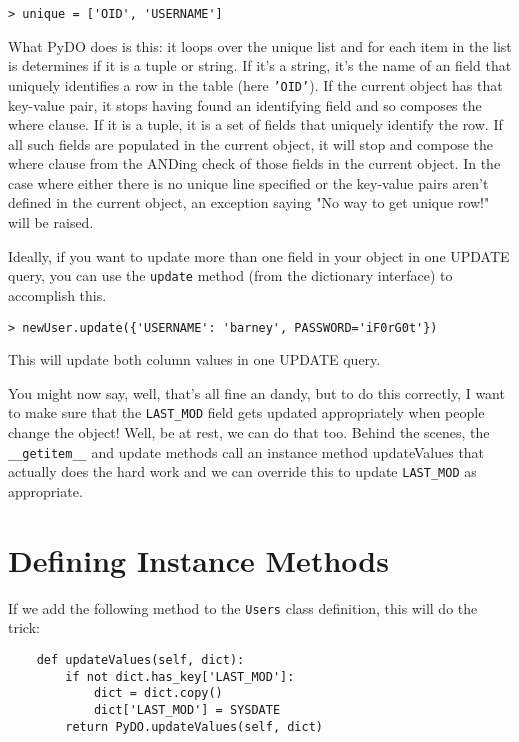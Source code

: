 \documentclass[titlepage]{manual}
\begin{document}
\begin{verbatim}
> unique = ['OID', 'USERNAME']
\end{verbatim}

What PyDO does is this: it loops over the unique list and for each
item in the list is determines if it is a tuple or string.  If it's a
string, it's the name of an field that uniquely identifies a row in
the table (here \texttt{'OID'}).  If the current object has that
key-value pair, it stops having found an identifying field and so
composes the where clause.  If it is a tuple, it is a set of fields
that uniquely identify the row.  If all such fields are populated in
the current object, it will stop and compose the where clause from the
ANDing check of those fields in the current object.  In the case where
either there is no unique line specified or the key-value pairs aren't
defined in the current object, an exception saying "No way to get
unique row!" will be raised.

Ideally, if you want to update more than one field in your object in
one UPDATE query, you can use the \texttt{update} method (from the
dictionary interface) to accomplish this.

\begin{verbatim}
> newUser.update({'USERNAME': 'barney', PASSWORD='iF0rG0t'})
\end{verbatim}

This will update both column values in one UPDATE query.

You might now say, well, that's all fine an dandy, but to do this
correctly, I want to make sure that the \texttt{LAST_MOD} field gets
updated appropriately when people change the object!  Well, be at
rest, we can do that too.  Behind the scenes, the \texttt{__getitem__}
and update methods call an instance method updateValues that actually
does the hard work and we can override this to update
\texttt{LAST_MOD} as appropriate.

\section{Defining Instance Methods}

If we add the following method to the \texttt{Users} class definition, this
will do the trick:

\begin{verbatim}
    def updateValues(self, dict):
        if not dict.has_key['LAST_MOD']:
            dict = dict.copy()
            dict['LAST_MOD'] = SYSDATE
        return PyDO.updateValues(self, dict)
\end{verbatim}
\end{document}
